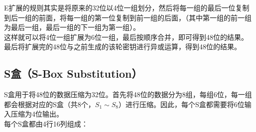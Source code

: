 E扩展的规则其实是将原来的32位以4位一组划分，然后将每一组的最后一位复制到后一组的前面，将每一组的第一位复制到前一组的后面，（其中第一组的前一组为最后一组，最后一组的下一组为第一组）。\\

这样就可以将4位一组扩展为6位一组，最后按顺序合并，即可得到48位的结果。\\

最后将扩展完的48位与之前生成的该轮密钥进行异或运算，得到48位的结果。\\

\subsection{S盒（S-Box Substitution）}

S盒用于将48位的数据压缩为32位。首先将48位的数据分为8组，每组6位，每一组都会根据对应的S盒（共8个，$ S_1 \sim S_8 $）进行压缩。因此，每个S盒都需要将6位输入压缩为4位输出。\\

每个S盒都由4行16列组成：\\

\begin{table}[H]
    \centering
    \caption{$ S_1 $}
\end{table}

